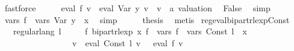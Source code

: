 \begin{isabellebody}
\ fastforce\isanewline
\ \ \isamarkupfalse%
\ \isamarkupfalse%
\ {\isachardoublequoteopen}eval\ {\isacharquery}{\kern0pt}f{\isacharprime}{\kern0pt}\ v\ {\isacharequal}{\kern0pt}\ eval\ {\isacharparenleft}{\kern0pt}Var\ y{\isacharparenright}{\kern0pt}\ v{\isachardoublequoteclose}\ \ v\ {\isacharcolon}{\kern0pt}{\isacharcolon}{\kern0pt}\ {\isachardoublequoteopen}{\isacharprime}{\kern0pt}a\ valuation{\isachardoublequoteclose}\ \isamarkupfalse%
\ False\ \isamarkupfalse%
\ simp\isanewline
\ \ \isamarkupfalse%
\ \isamarkupfalse%
\ {\isachardoublequoteopen}vars\ {\isacharquery}{\kern0pt}f{\isacharprime}{\kern0pt}\ {\isacharequal}{\kern0pt}\ vars\ {\isacharparenleft}{\kern0pt}Var\ y{\isacharparenright}{\kern0pt}\ {\isasymunion}\ {\isacharbraceleft}{\kern0pt}x{\isacharbraceright}{\kern0pt}{\isachardoublequoteclose}\ \isamarkupfalse%
\ simp\isanewline
\ \ \isamarkupfalse%
\ \isamarkupfalse%
\ {\isacharquery}{\kern0pt}thesis\ \isamarkupfalse%
\ metis\isanewline
{}\isamarkupfalse%
%
\endisatagproof
{\isafoldproof}%
%
\isadelimproof
\isanewline
%
\endisadelimproof
\isanewline
{}\isamarkupfalse%
\ reg{\isacharunderscore}{\kern0pt}eval{\isacharunderscore}{\kern0pt}bipart{\isacharunderscore}{\kern0pt}rlexp{\isacharunderscore}{\kern0pt}Const{\isacharcolon}{\kern0pt}\isanewline
\ \ \ {\isachardoublequoteopen}regular{\isacharunderscore}{\kern0pt}lang\ l{\isachardoublequoteclose}\isanewline
\ \ \ \ \ {\isachardoublequoteopen}{\isasymexists}f{\isacharprime}{\kern0pt}{\isachardot}{\kern0pt}\ bipart{\isacharunderscore}{\kern0pt}rlexp\ x\ f{\isacharprime}{\kern0pt}\ {\isasymand}\ vars\ f{\isacharprime}{\kern0pt}\ {\isacharequal}{\kern0pt}\ vars\ {\isacharparenleft}{\kern0pt}Const\ l{\isacharparenright}{\kern0pt}\ {\isasymunion}\ {\isacharbraceleft}{\kern0pt}x{\isacharbraceright}{\kern0pt}\isanewline
\ \ \ \ \ \ \ \ \ \ \ \ \ \ \ \ {\isasymand}\ {\isacharparenleft}{\kern0pt}{\isasymforall}v{\isachardot}{\kern0pt}\ {\isasymPsi}\ {\isacharparenleft}{\kern0pt}eval\ {\isacharparenleft}{\kern0pt}Const\ l{\isacharparenright}{\kern0pt}\ v{\isacharparenright}{\kern0pt}\ {\isacharequal}{\kern0pt}\ {\isasymPsi}\ {\isacharparenleft}{\kern0pt}eval\ f{\isacharprime}{\kern0pt}\ v{\isacharparenright}{\kern0pt}{\isacharparenright}{\kern0pt}{\isachardoublequoteclose}\isanewline
%
\isadelimproof

\end{isabellebody}
